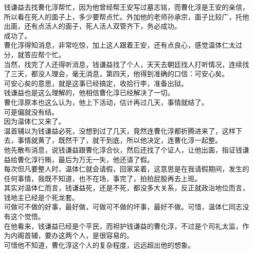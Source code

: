 \begin{multicols}{\theparacolNo}
钱谦益去找曹化淳帮忙，因为他曾经帮王安写过墓志铭，而曹化淳是王安的亲信，所以看在死人的面子上，多少要帮点忙。外加他的老师孙承宗，面子比较广，托他出面，还有点活人的面子，死人活人双管齐下，务必成功。\\

成功了。\\

曹化淳得知消息，非常吃惊，加上这人跟着王安，还有点良心，感觉温体仁太过分，就答应帮个忙。\\

当然，找完了人还得听消息，钱谦益找了个人，天天去朝廷找人打听情况，连续找了三天，都没人理会，毫无消息，第四天，他得到准确的口信：可安心矣。\\

可安心矣的意思，就是这事已经搞定，收拾行李，准备出狱。\\

钱谦益也是这么理解的，他相信曹化淳已经解决了一切。\\

曹化淳原本也这么认为，他上下活动，估计再过几天，事情就结了。\\

可是偏就没有结。\\

因为温体仁又来了。\\

温首辅以为钱谦益必死，没想到过了几天，竟然连曹化淳都折腾进来了，这样下去，事情就黄了，既然干了，就干到底，所以他决定，连曹化淳一起整。\\

他先散布消息，说钱谦益跟曹化淳合伙，然后还找了个证人，让他出面，指证钱谦益给曹化淳行贿，最后为万无一失，他还请了假。\\

每次但凡要整人时，温体仁就会请假，回家呆着，这意思是在我请假期间，发生的任何事情，我既不知道，也不在场，事完了，拍拍屁股再去上班。\\

其实对温体仁而言，钱谦益死，还是不死，都没多大关系，反正就政治地位而言，钱地主已经是个死龙套。\\

可做可不做的好事，最好做，可做可不做的坏事，最好不做。可惜，温体仁同志没有这个觉悟。\\

在他看来，钱谦益已经是个平民，而袒护钱谦益的曹化淳，不过是个司礼太监，作为内阁首辅，要办这两个人，是很容易的。\\

可惜他不知道，曹化淳这个人的复杂程度，远远超出他的想象。\\


\end{multicols}
